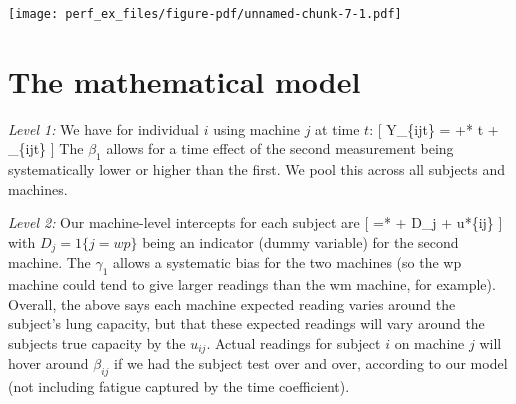 \documentclass[
  letterpaper,
  DIV=11,
  numbers=noendperiod]{scrreprt}
\newenvironment{Shaded}{}{}
\newcommand{\AttributeTok}[1]{\textcolor[rgb]{0.49,0.56,0.16}{#1}}
\newcommand{\DecValTok}[1]{\textcolor[rgb]{0.25,0.63,0.44}{#1}}
\newcommand{\FloatTok}[1]{\textcolor[rgb]{0.25,0.63,0.44}{#1}}
\newcommand{\FunctionTok}[1]{\textcolor[rgb]{0.02,0.16,0.49}{#1}}
\newcommand{\NormalTok}[1]{#1}
\newcommand{\OtherTok}[1]{\textcolor[rgb]{0.00,0.44,0.13}{#1}}
\newcommand{\SpecialCharTok}[1]{\textcolor[rgb]{0.25,0.44,0.63}{#1}}
\begin{document}
\begin{Shaded}
\end{Shaded}

\texttt{[image: perf\_ex\_files/figure-pdf/unnamed-chunk-7-1.pdf]}

\section{The mathematical model}\label{the-mathematical-model-1}

\emph{Level 1:} We have for individual \(i\) using machine \(j\) at time
\(t\): {[} Y\_\{ijt\} =  +*  t + \epsilon\_\{ijt\}
{]} The \(\beta_{1}\) allows for a time effect of the second measurement
being systematically lower or higher than the first. We pool this across
all subjects and machines.

\emph{Level 2:} Our machine-level intercepts for each subject are {[}
 =*  +  D\_j + u*\{ij\} {]} with
\(D_j = 1\{ j = wp \}\) being an indicator (dummy variable) for the
second machine. The \(\gamma_1\) allows a systematic bias for the two
machines (so the wp machine could tend to give larger readings than the
wm machine, for example). Overall, the above says each machine expected
reading varies around the subject's lung capacity, but that these
expected readings will vary around the subjects true capacity by the
\(u_{ij}\). Actual readings for subject \(i\) on machine \(j\) will
hover around \(\beta_{ij}\) if we had the subject test over and over,
according to our model (not including fatigue captured by the time
coefficient).
\end{document}
